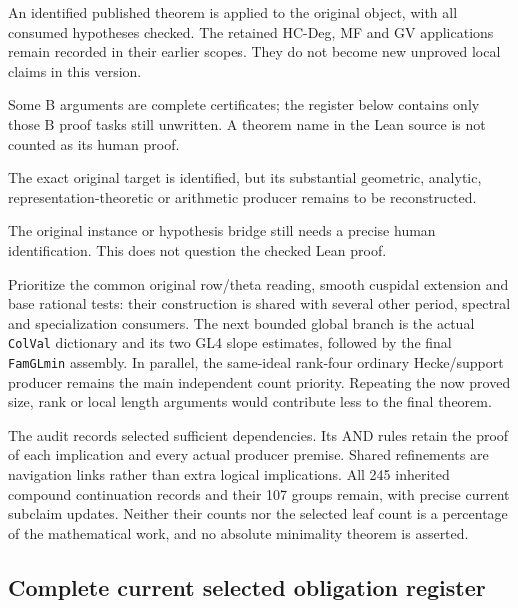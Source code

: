 \begin{description}[style=nextline]
\item[A: matched published application.]
An identified published theorem is applied to the original object,
with all consumed hypotheses checked. The retained HC-Deg, MF and
GV applications remain recorded in their earlier scopes. They do
not become new unproved local claims in this version.
\item[B: independent elementary or moderate reconstruction.]
Some B arguments are complete certificates; the register below
contains only those B proof tasks still unwritten. A theorem name
in the Lean source is not counted as its human proof.
\item[C: substantial construction or proof.]
The exact original target is identified, but its substantial
geometric, analytic, representation-theoretic or arithmetic
producer remains to be reconstructed.
\item[D: incomplete human source understanding.]
The original instance or hypothesis bridge still needs a precise
human identification. This does not question the checked Lean proof.
\end{description}

Prioritize the common original row/theta reading, smooth cuspidal
extension and base rational tests: their construction is shared
with several other period, spectral and specialization consumers.
The next bounded global branch is the actual \texttt{ColVal}
dictionary and its two GL4 slope estimates, followed by the final
\texttt{FamGLmin} assembly. In parallel, the same-ideal rank-four
ordinary Hecke/support producer remains the main independent count
priority. Repeating the now proved size, rank or local length
arguments would contribute less to the final theorem.

The audit records selected sufficient dependencies. Its AND rules
retain the proof of each implication and every actual producer
premise. Shared refinements are navigation links rather than extra
logical implications. All 245 inherited compound continuation records
and their 107 groups remain, with precise current subclaim updates.
Neither their counts nor the selected leaf count is a percentage of
the mathematical work, and no absolute minimality theorem is asserted.

\subsection{Complete current selected obligation register}

